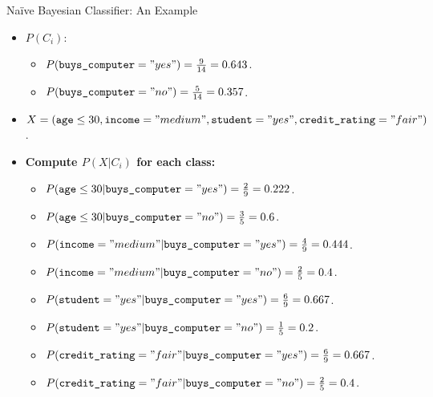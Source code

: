 \begin{frame}{Naïve Bayesian Classifier: An Example}
	\begin{itemize}
		\item $P(C_i)$:
		      \begin{itemize}
			      \item $P(\texttt{buys\_computer} = "yes") = \frac{9}{14} = 0.643$.
			      \item $P(\texttt{buys\_computer} = "no") = \frac{5}{14} = 0.357$.
		      \end{itemize}
		\item $X = (\texttt{age} \leq 30 , \texttt{income} = "medium", \texttt{student} = "yes", \texttt{credit\_rating} = "fair")$.
		\item \textbf{Compute $P(X|C_i)$ for each class:}
		      \begin{itemize}
			      \item $P(\texttt{age} \leq 30 | \texttt{buys\_computer} = "yes") = \frac{2}{9} = 0.222$.
			      \item $P(\texttt{age} \leq 30 | \texttt{buys\_computer} = "no") = \frac{3}{5} = 0.6$.
			      \item $P(\texttt{income} = "medium" | \texttt{buys\_computer} = "yes") = \frac{4}{9} = 0.444$.
			      \item $P(\texttt{income} = "medium" | \texttt{buys\_computer} = "no") = \frac{2}{5} = 0.4$.
			      \item $P(\texttt{student} = "yes" | \texttt{buys\_computer} = "yes") = \frac{6}{9} = 0.667$.
			      \item $P(\texttt{student} = "yes" | \texttt{buys\_computer} = "no") = \frac{1}{5} = 0.2$.
			      \item $P(\texttt{credit\_rating} = "fair" | \texttt{buys\_computer} = "yes") = \frac{6}{9} = 0.667$.
			      \item $P(\texttt{credit\_rating} = "fair" | \texttt{buys\_computer} = "no") = \frac{2}{5} = 0.4$.
		      \end{itemize}
	\end{itemize}
\end{frame}

